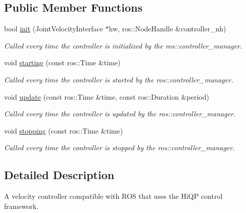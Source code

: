 \subsection*{Public Member Functions}
\begin{DoxyCompactItemize}
\item 
bool \hyperlink{classhiqp_1_1ROSKinematicsController_a9acc590f4c514c1321f95f0667d1aae0}{init} (Joint\-Velocity\-Interface $\ast$hw, ros\-::\-Node\-Handle \&controller\-\_\-nh)
\begin{DoxyCompactList}\small\item\em Called every time the controller is initialized by the ros\-::controller\-\_\-manager. \end{DoxyCompactList}\item 
void \hyperlink{classhiqp_1_1ROSKinematicsController_a216a9b24cbb343496614d027868af72e}{starting} (const ros\-::\-Time \&time)
\begin{DoxyCompactList}\small\item\em Called every time the controller is started by the ros\-::controller\-\_\-manager. \end{DoxyCompactList}\item 
void \hyperlink{classhiqp_1_1ROSKinematicsController_aa4cc3905801b4097916731d0d7af2089}{update} (const ros\-::\-Time \&time, const ros\-::\-Duration \&period)
\begin{DoxyCompactList}\small\item\em Called every time the controller is updated by the ros\-::controller\-\_\-manager. \end{DoxyCompactList}\item 
void \hyperlink{classhiqp_1_1ROSKinematicsController_a683aa002bcca543a308e2a8ab507cfa5}{stopping} (const ros\-::\-Time \&time)
\begin{DoxyCompactList}\small\item\em Called every time the controller is stopped by the ros\-::controller\-\_\-manager. \end{DoxyCompactList}\end{DoxyCompactItemize}


\subsection{Detailed Description}
A velocity controller compatible with R\-O\-S that uses the Hi\-Q\-P control framework. 

